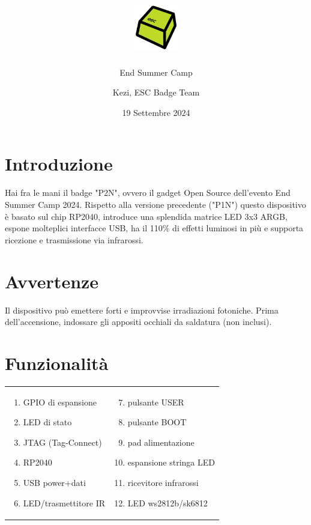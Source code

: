 \documentclass[10pt]{datasheet}
\title{\includegraphics[height=2cm]{logo} \raisebox{1\height}{Mini-badge "P2N" - Manuale Tascabile}}
\author{End Summer Camp}
\date{19 Settembre 2024}
\author{Kezi, ESC Badge Team}
\begin{document}
	\maketitle
	
	\section{Introduzione}
	Hai fra le mani il badge "P2N", ovvero il gadget Open Source dell'evento End Summer Camp 2024.
	Rispetto alla versione precedente ("P1N") questo dispositivo è basato sul chip RP2040, introduce una splendida matrice LED 3x3 ARGB, espone molteplici interfacce USB, ha il 110\% di effetti luminosi in più e supporta ricezione e trasmissione via infrarossi.
	
	\section{Avvertenze}
	Il dispositivo può emettere forti e improvvise irradiazioni fotoniche.
	Prima dell'accensione, indossare gli appositi occhiali da saldatura
	(non inclusi).
	
	\section{Funzionalità}
	\begin{tabular}{l l}
		  \begin{minipage}{1.45in}

				\begin{enumerate}[itemsep=1pt]
				\item{GPIO di espansione}
				\item{LED di stato}
				\item{JTAG (Tag-Connect)}
				\item{RP2040}
				\item{USB power+dati}
				\item{LED/trasmettitore IR}

			\end{enumerate} 
			
			\end{minipage}&
				  \begin{minipage}{2in}

			\begin{enumerate}[itemsep=1pt]
			\setcounter{enumi}{6}
			\item{pulsante USER}
			\item{pulsante BOOT}
			\item{pad alimentazione}
			\item{espansione stringa LED}
			\item{ricevitore infrarossi}
			\item LED ws2812b/sk6812
			\end{enumerate} 
			
		\end{minipage}
	\end{tabular}
\end{document}
